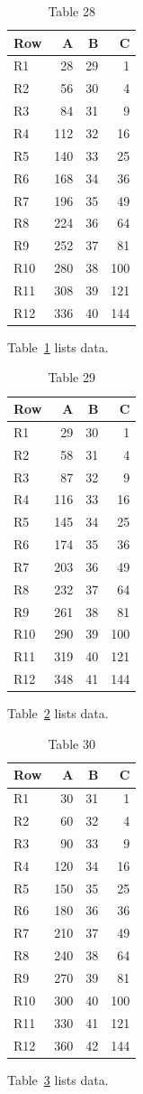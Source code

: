 \documentclass[10pt]{article}
\begin{document}
\begin{table}[ht]\centering\caption{Table 28}\label{tab:28}\begin{tabular}{lrrr}\toprule Row&A&B&C\\\midrule
R1&28&29&1\\
R2&56&30&4\\
R3&84&31&9\\
R4&112&32&16\\
R5&140&33&25\\
R6&168&34&36\\
R7&196&35&49\\
R8&224&36&64\\
R9&252&37&81\\
R10&280&38&100\\
R11&308&39&121\\
R12&336&40&144\\
\bottomrule\end{tabular}\end{table} Table~\ref{tab:28} lists data.
\begin{table}[ht]\centering\caption{Table 29}\label{tab:29}\begin{tabular}{lrrr}\toprule Row&A&B&C\\\midrule
R1&29&30&1\\
R2&58&31&4\\
R3&87&32&9\\
R4&116&33&16\\
R5&145&34&25\\
R6&174&35&36\\
R7&203&36&49\\
R8&232&37&64\\
R9&261&38&81\\
R10&290&39&100\\
R11&319&40&121\\
R12&348&41&144\\
\bottomrule\end{tabular}\end{table} Table~\ref{tab:29} lists data.
\begin{table}[ht]\centering\caption{Table 30}\label{tab:30}\begin{tabular}{lrrr}\toprule Row&A&B&C\\\midrule
R1&30&31&1\\
R2&60&32&4\\
R3&90&33&9\\
R4&120&34&16\\
R5&150&35&25\\
R6&180&36&36\\
R7&210&37&49\\
R8&240&38&64\\
R9&270&39&81\\
R10&300&40&100\\
R11&330&41&121\\
R12&360&42&144\\
\bottomrule\end{tabular}\end{table}\clearpage Table~\ref{tab:30} lists data.
\end{document}
